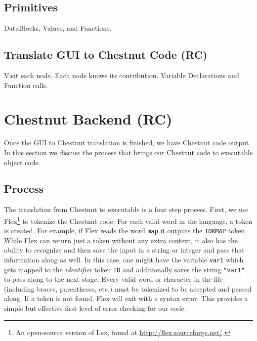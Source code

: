 \documentclass{article}
\renewcommand{\|}{\origbar} %
\newcommand{\code}[1]{\texttt{#1}}
\begin{document}
\subsection{Primitives}

DataBlocks, Values, and Functions.

\subsection{Translate GUI to Chestnut Code (RC)}

Visit each node. Each node knows its contribution. Variable Declarations and Function calls.

\section{Chestnut Backend (RC)}

Once the GUI to Chestnut translation is finished, we have Chestnut code output. In this section we discuss the process that brings our Chestnut code to executable object code.

\subsection{Process}

The translation from Chestnut to executable is a four step process. First, we use Flex\footnote{An open-source version of Lex, found at \url{http://flex.sourceforge.net/}.} to tokenize the Chestnut code. For each valid word in the language, a token is created. For example, if Flex reads the word \code{map} it outputs the \code{TOKMAP} token. While Flex can return just a token without any extra context, it also has the ability to recognize and then save the input in a string or integer and pass that information along as well. In this case, one might have the variable \code{var1} which gets mapped to the {\em identifier} token \code{ID} and additionally saves the string \code{"var1"} to pass along to the next stage. Every valid word or character in the file (including braces, parentheses, etc.) must be tokenized to be accepted and passed along. If a token is not found, Flex will exit with a syntax error. This provides a simple but effective first level of error checking for our code.
\end{document}
